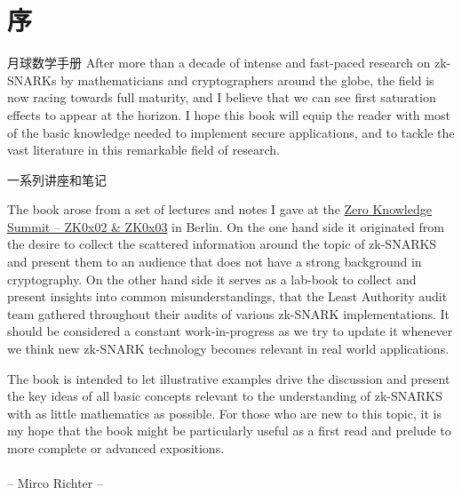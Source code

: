 \chapter*{序}
月球数学手册
After more than a decade of intense and fast-paced research on zk-SNARKs by mathematicians
and cryptographers around the globe, the field is now racing towards full maturity, and I believe that we can see first saturation effects to appear at the horizon. I hope this book will equip the reader with most of the basic knowledge needed to implement secure applications, and to tackle the vast literature in this remarkable field of research.

一系列讲座和笔记

The book arose from a set of lectures and notes I gave at the \href{https://www.zksummit.com/}{Zero Knowledge Summit – ZK0x02 \& ZK0x03} in Berlin. On the one hand side it originated from the desire to collect the scattered information around the topic of zk-SNARKS and present them to an audience that does not have a strong background in cryptography. On the other hand side it serves as a lab-book to collect and present insights  into common misunderstandings, that the Least Authority audit team gathered throughout their audits of various zk-SNARK implementations. It should be considered a constant work-in-progress as we try to update it whenever we think new zk-SNARK technology becomes relevant in real world applications. 

The book is intended to let illustrative examples drive the discussion and present the key ideas of all basic concepts relevant to the understanding of zk-SNARKS with as little mathematics as possible. For those who are new to this topic, it is my hope that the book might be particularly useful as a first read and prelude to more complete or advanced expositions.
\\
\\
\hspace*{0pt}\hfill -- Mirco Richter --

